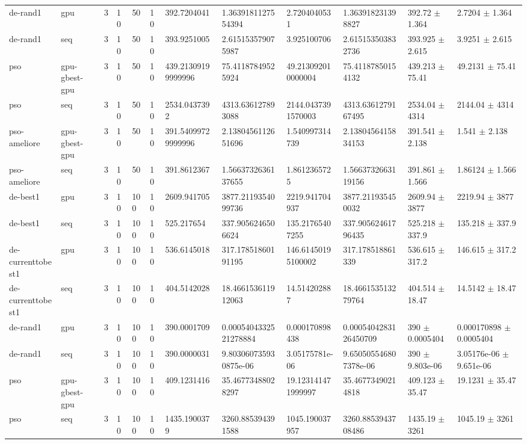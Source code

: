 \begin{table}[t]
\begin{tabular}{llllllllllll}
de-rand1 & gpu & 3 & 10 & 50 & 10 & 392.7204041 & 1.3639181127554394 & 2.7204040531 & 1.363918231398827 & 392.72 $\pm$ 1.364 & 2.7204 $\pm$ 1.364 \\
de-rand1 & seq & 3 & 10 & 50 & 10 & 393.9251005 & 2.615153579075987 & 3.925100706 & 2.615153503832736 & 393.925 $\pm$ 2.615 & 3.9251 $\pm$ 2.615 \\
pso & gpu-gbest-gpu & 3 & 10 & 50 & 10 & 439.21309199999996 & 75.41187849525924 & 49.213092010000004 & 75.41187850154132 & 439.213 $\pm$ 75.41 & 49.2131 $\pm$ 75.41 \\
pso & seq & 3 & 10 & 50 & 10 & 2534.0437392 & 4313.636127893088 & 2144.0437391570003 & 4313.6361279167495 & 2534.04 $\pm$ 4314 & 2144.04 $\pm$ 4314 \\
pso-ameliore & gpu-gbest-gpu & 3 & 10 & 50 & 10 & 391.54099729999996 & 2.1380456112651696 & 1.540997314739 & 2.1380456415834153 & 391.541 $\pm$ 2.138 & 1.541 $\pm$ 2.138 \\
pso-ameliore & seq & 3 & 10 & 50 & 10 & 391.8612367 & 1.5663732636137655 & 1.8612365725 & 1.5663732663119156 & 391.861 $\pm$ 1.566 & 1.86124 $\pm$ 1.566 \\
de-best1 & gpu & 3 & 10 & 100 & 10 & 2609.941705 & 3877.2119354099736 & 2219.941704937 & 3877.211935450032 & 2609.94 $\pm$ 3877 & 2219.94 $\pm$ 3877 \\
de-best1 & seq & 3 & 10 & 100 & 10 & 525.217654 & 337.9056246506624 & 135.21765407255 & 337.90562461796435 & 525.218 $\pm$ 337.9 & 135.218 $\pm$ 337.9 \\
de-currenttobest1 & gpu & 3 & 10 & 100 & 10 & 536.6145018 & 317.17851860191195 & 146.61450195100002 & 317.178518861339 & 536.615 $\pm$ 317.2 & 146.615 $\pm$ 317.2 \\
de-currenttobest1 & seq & 3 & 10 & 100 & 10 & 404.5142028 & 18.466153611912063 & 14.514202887 & 18.466153513279764 & 404.514 $\pm$ 18.47 & 14.5142 $\pm$ 18.47 \\
de-rand1 & gpu & 3 & 10 & 100 & 10 & 390.0001709 & 0.0005404332521278884 & 0.000170898438 & 0.0005404283126450709 & 390 $\pm$ 0.0005404 & 0.000170898 $\pm$ 0.0005404 \\
de-rand1 & seq & 3 & 10 & 100 & 10 & 390.0000031 & 9.803060735930875e-06 & 3.05175781e-06 & 9.650505546807378e-06 & 390 $\pm$ 9.803e-06 & 3.05176e-06 $\pm$ 9.651e-06 \\
pso & gpu-gbest-gpu & 3 & 10 & 100 & 10 & 409.1231416 & 35.46773488028297 & 19.123141471999997 & 35.46773490214818 & 409.123 $\pm$ 35.47 & 19.1231 $\pm$ 35.47 \\
pso & seq & 3 & 10 & 100 & 10 & 1435.1900379 & 3260.885394391588 & 1045.190037957 & 3260.8853943708486 & 1435.19 $\pm$ 3261 & 1045.19 $\pm$ 3261 \\

\end{tabular}
\end{table}
